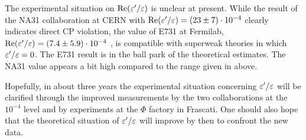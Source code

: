 The experimental situation on ${\rm Re}(\varepsilon'/\varepsilon)$ is unclear at present.  While
the result of the NA31 collaboration at CERN with ${\rm Re}(\varepsilon'/\varepsilon) = (23 \pm
7)\cdot 10^{-4}$ \cite{barr:93} clearly indicates direct CP violation,
the value of E731 at Fermilab, ${\rm Re}(\varepsilon'/\varepsilon) = (7.4 \pm 5.9)\cdot 10^{-4}$
\cite{gibbons:93}, is compatible with superweak theories
\cite{wolfenstein:64} in which $\varepsilon'/\varepsilon = 0$.  The E731 result is in the
ball park of the theoretical estimates.  The NA31 value appears a bit
high compared to the range given in  above.

Hopefully, in about three years the experimental situation concerning
$\varepsilon'/\varepsilon$ will be clarified through the improved measurements by the two
collaborations at the $10^{-4}$ level and by experiments at the $\Phi$
factory in Frascati.  One should also hope that the theoretical
situation of $\varepsilon'/\varepsilon$ will improve by then to confront the new data.
